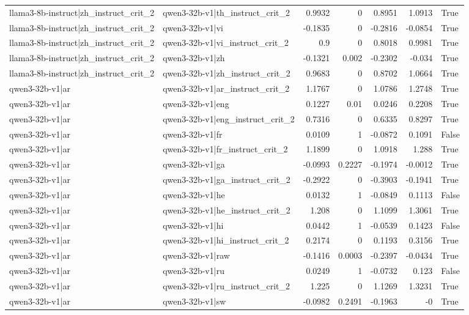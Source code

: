 \begin{table}
\begin{tabular}{l l r r r r l}
llama3-8b-instruct|zh_instruct_crit_2 & qwen3-32b-v1|th_instruct_crit_2 & 0.9932 & 0 & 0.8951 & 1.0913 & True \\
llama3-8b-instruct|zh_instruct_crit_2 & qwen3-32b-v1|vi & -0.1835 & 0 & -0.2816 & -0.0854 & True \\
llama3-8b-instruct|zh_instruct_crit_2 & qwen3-32b-v1|vi_instruct_crit_2 & 0.9 & 0 & 0.8018 & 0.9981 & True \\
llama3-8b-instruct|zh_instruct_crit_2 & qwen3-32b-v1|zh & -0.1321 & 0.002 & -0.2302 & -0.034 & True \\
llama3-8b-instruct|zh_instruct_crit_2 & qwen3-32b-v1|zh_instruct_crit_2 & 0.9683 & 0 & 0.8702 & 1.0664 & True \\
qwen3-32b-v1|ar & qwen3-32b-v1|ar_instruct_crit_2 & 1.1767 & 0 & 1.0786 & 1.2748 & True \\
qwen3-32b-v1|ar & qwen3-32b-v1|eng & 0.1227 & 0.01 & 0.0246 & 0.2208 & True \\
qwen3-32b-v1|ar & qwen3-32b-v1|eng_instruct_crit_2 & 0.7316 & 0 & 0.6335 & 0.8297 & True \\
qwen3-32b-v1|ar & qwen3-32b-v1|fr & 0.0109 & 1 & -0.0872 & 0.1091 & False \\
qwen3-32b-v1|ar & qwen3-32b-v1|fr_instruct_crit_2 & 1.1899 & 0 & 1.0918 & 1.288 & True \\
qwen3-32b-v1|ar & qwen3-32b-v1|ga & -0.0993 & 0.2227 & -0.1974 & -0.0012 & True \\
qwen3-32b-v1|ar & qwen3-32b-v1|ga_instruct_crit_2 & -0.2922 & 0 & -0.3903 & -0.1941 & True \\
qwen3-32b-v1|ar & qwen3-32b-v1|he & 0.0132 & 1 & -0.0849 & 0.1113 & False \\
qwen3-32b-v1|ar & qwen3-32b-v1|he_instruct_crit_2 & 1.208 & 0 & 1.1099 & 1.3061 & True \\
qwen3-32b-v1|ar & qwen3-32b-v1|hi & 0.0442 & 1 & -0.0539 & 0.1423 & False \\
qwen3-32b-v1|ar & qwen3-32b-v1|hi_instruct_crit_2 & 0.2174 & 0 & 0.1193 & 0.3156 & True \\
qwen3-32b-v1|ar & qwen3-32b-v1|raw & -0.1416 & 0.0003 & -0.2397 & -0.0434 & True \\
qwen3-32b-v1|ar & qwen3-32b-v1|ru & 0.0249 & 1 & -0.0732 & 0.123 & False \\
qwen3-32b-v1|ar & qwen3-32b-v1|ru_instruct_crit_2 & 1.225 & 0 & 1.1269 & 1.3231 & True \\
qwen3-32b-v1|ar & qwen3-32b-v1|sw & -0.0982 & 0.2491 & -0.1963 & -0 & True \\

\end{tabular}
\end{table}
